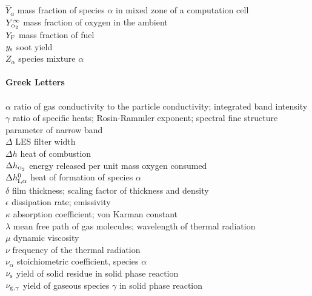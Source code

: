 \begin{tabbing}
$\hat{Y}_\alpha$          \> mass fraction of species $\alpha$ in mixed zone of a computation cell \\
$Y_{\text{\tiny \hbox{O}$_2$}}^\infty$          \> mass fraction of oxygen in the ambient   \\
$Y_{\rm F}$               \> mass fraction of fuel   \\
$y_{\rm s}$               \> soot yield \\
$Z_\alpha$                \> species mixture $\alpha$   \\
\hspace{0.1in}            \> \\
{\bf Greek Letters}       \> \\
\hspace{0.1in}            \> \\
$\alpha$                  \> ratio of gas conductivity to the particle conductivity; integrated band intensity \\
$\gamma$                  \> ratio of specific heats; Rosin-Rammler exponent; spectral fine structure parameter of narrow band \\
$\Delta$                  \> LES filter width \\
$\Delta h$                \> heat of combustion \\
$\Delta h_{\text{\tiny \hbox{O}$_2$}}$          \> energy released per unit mass oxygen consumed \\
$\Delta h_{\rm f,\alpha}^0$ \> heat of formation of species $\alpha$ \\
$\delta$                  \> film thickness; scaling factor of thickness and density \\
$\epsilon$                \> dissipation rate; emissivity \\
$\kappa$                  \> absorption coefficient; von Karman constant \\
$\lambda$                 \> mean free path of gas molecules; wavelength of thermal radiation\\
$\mu$                     \> dynamic viscosity \\
$\nu$                     \> frequency of the thermal radiation \\
$\nu_\alpha$              \> stoichiometric coefficient, species $\alpha$ \\
$\nu_{\rm s}$             \> yield of solid residue in solid phase reaction \\
$\nu_{{\rm g},\gamma}$    \> yield of gaseous species $\gamma$ in solid phase reaction \\

\end{tabbing}
